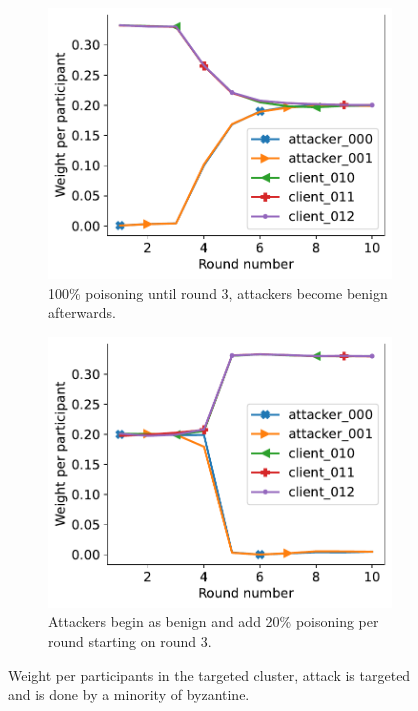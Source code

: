\begin{figure}[t]
  \centering 
  \begin{subfigure}{0.49\columnwidth}
    \centering 
    \includegraphics[width=\linewidth]{figures/reput/redemption_byzantine_min.pdf}    
    \caption{100\% poisoning until round 3, attackers become benign afterwards.}
    \label{fig:redemption_byzantine_min}
  \end{subfigure}
 \begin{subfigure}{0.49\columnwidth}
    \centering 
    \includegraphics[width=\linewidth]{figures/reput/increment_byzantine_min.pdf}    \caption{Attackers begin as benign and add 20\% poisoning per round starting on round 3.}
    \label{fig:increment_byzantine_min}
  \end{subfigure}
  \caption{Weight per participants in the targeted cluster, attack is targeted and is done by a minority of byzantine.}
  \label{fig:redemption_decrease}
\end{figure}

